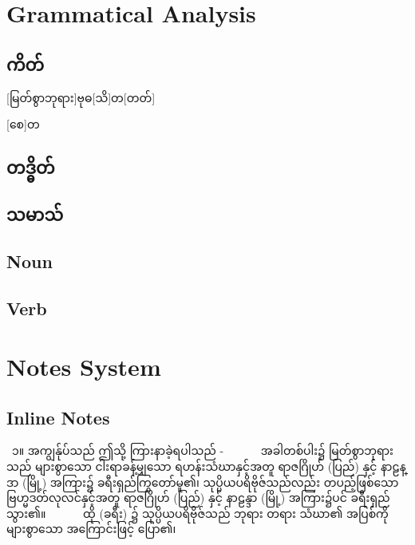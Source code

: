 


\section{Grammatical Analysis}
\subsection{ကိတ်}
\kitabasic{}{}{}

[မြတ်စွာဘုရား]{ဗုဓ}[သိ]{တ}[တတ်]

\kitafull{}{}{}{}


\kitafull*{}{}{}{}

[စေ]{တ}

\subsection{တဒ္ဓိတ်}
\taddhita{}{}{}

\subsection{သမာသ်}
\samasa{}{}{}

\subsection{Noun}

\subsection{Verb}


\section{Notes System}
\subsection{Inline Notes}
 ၁။ အကျွန်ုပ်သည် ဤသို့ ကြားနာခဲ့ရပါသည် -
       အခါတစ်ပါး၌ မြတ်စွာဘုရားသည် များစွာသော ငါးရာခန့်မျှသော ရဟန်းသံဃာနှင့်အတူ ရာဇဂြိုဟ် (ပြည်) နှင့် နာဠန္ဒာ (မြို့) အကြား၌ ခရီးရှည်ကြွတော်မူ၏၊ သုပ္ပိယပရိဗိုဇ်သည်လည်း တပည့်ဖြစ်သော ဗြဟ္မဒတ်လုလင်နှင့်အတူ ရာဇဂြိုဟ် (ပြည်) နှင့် နာဠန္ဒာ (မြို့) အကြား၌ပင် ခရီးရှည်သွား၏။
       ထို (ခရီး) ၌ သုပ္ပိယပရိဗိုဇ်သည် ဘုရား တရား သံဃာ၏ အပြစ်ကို များစွာသော အကြောင်းဖြင့် ပြော၏၊ 

